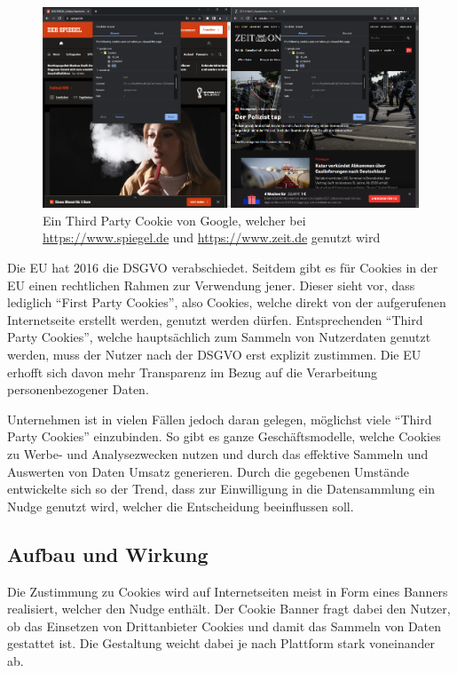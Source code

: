 \begin{figure}[ht]
	\centering
	\includegraphics[width=1\textwidth]{Bilder/Cookies.png} 
	\caption{Ein Third Party Cookie von Google, welcher bei \url{https://www.spiegel.de} und \url{https://www.zeit.de} genutzt wird}
	\label{fig:Third-Party}
\end{figure}

Die \ac{EU} hat 2016 die \ac{DSGVO} verabschiedet. \parencite{EuropaischeUnion.2016} Seitdem gibt es für Cookies in der \ac{EU} einen rechtlichen Rahmen zur Verwendung jener. Dieser sieht vor, dass lediglich ``First Party Cookies'', also Cookies, welche direkt von der aufgerufenen Internetseite erstellt werden, genutzt werden dürfen. Entsprechenden ``Third Party Cookies'', welche hauptsächlich zum Sammeln von Nutzerdaten genutzt werden, muss der Nutzer nach der \ac{DSGVO} erst explizit zustimmen. Die \ac{EU} erhofft sich davon mehr Transparenz im Bezug auf die Verarbeitung personenbezogener Daten. \parencite[S. 84]{EuropaischeUnion.2016}

Unternehmen ist in vielen Fällen jedoch daran gelegen, möglichst viele ``Third Party Cookies'' einzubinden. So gibt es ganze Geschäftsmodelle, welche Cookies zu Werbe- und Analysezwecken nutzen und durch das effektive Sammeln und Auswerten von Daten Umsatz generieren.\parencite[S. 418-420]{.2012} Durch die gegebenen Umstände entwickelte sich so der Trend, dass zur Einwilligung in die Datensammlung ein Nudge genutzt wird, welcher die Entscheidung beeinflussen soll.

\subsection{Aufbau und Wirkung}
Die Zustimmung zu Cookies wird auf Internetseiten meist in Form eines Banners realisiert, welcher den Nudge enthält. Der Cookie Banner fragt dabei den Nutzer, ob das Einsetzen von Drittanbieter Cookies und damit das Sammeln von Daten gestattet ist. Die Gestaltung weicht dabei je nach Plattform stark voneinander ab.

